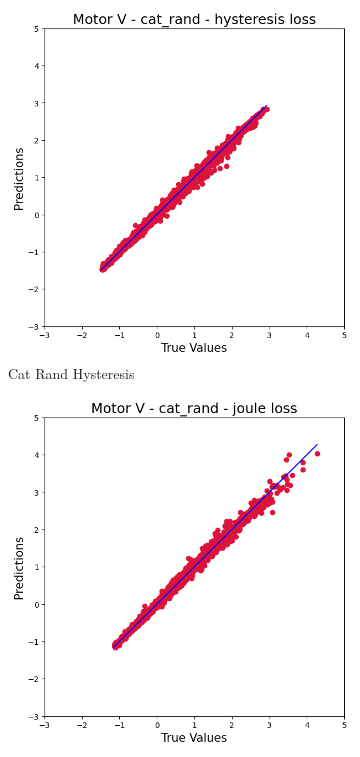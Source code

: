 \documentclass{article}
\begin{document}
\begin{figure}[!htbp]
    \vspace{0.3cm}
    
    \begin{subfigure}[b]{0.23\textwidth}
        \centering
        \null
    \end{subfigure}
    \hfill
    \centering
    \begin{subfigure}[b]{0.23\textwidth}
        \centering
        \includegraphics[width=\textwidth]{images/V/cat_rand_hysteresis.png}
        \caption{Cat Rand Hysteresis}
    \end{subfigure}
    \hfill
    \begin{subfigure}[b]{0.23\textwidth}
        \centering
        \includegraphics[width=\textwidth]{images/V/cat_rand_joule.png}

\end{subfigure}
\end{figure}
\end{document}

